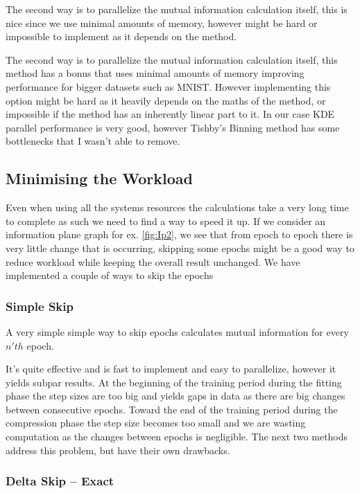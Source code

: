\documentclass[dissertation.tex]{subfiles}
\begin{document}
The second way is to parallelize the mutual information calculation itself, this
is nice since we use minimal amounts of memory, however might be hard or
impossible to implement as it depends on the method.

The second way is to parallelize the mutual information calculation itself, this
method has a  bonus that uses minimal amounts of memory improving performance
for bigger datasets such as MNIST. However implementing this option might be
hard as it heavily depends on the maths of the method, or impossible if the
method has an inherently linear part to it. In our case KDE parallel performance
is very good, however Tishby's Binning method has some bottlenecks that I
wasn't able to remove.

\subsection{Minimising the Workload}

Even when using all the systems resources the calculations take a very long
time to complete as such we need to find a way to speed it up. If we consider an
information plane graph for ex. \autoref{fig:Ip2}, we see that from epoch to
epoch there is very little change that is occurring, skipping some epochs might
be a good way to reduce workload while keeping the overall result unchanged. We
have implemented a couple of ways to skip the epochs 

\subsubsection{Simple Skip}
  
  A very simple simple way to skip epochs calculates mutual information for
  every $n'th$ epoch.

  It's quite effective and is fast to implement and easy to parallelize, however
  it yields subpar results. At the beginning of the training period during the
  fitting phase the step sizes are too big and yields gaps in data as there are
  big changes between consecutive epochs. Toward the end of the training period
  during the compression phase the step size becomes too small and we are
  wasting computation as the changes between epochs is negligible. The next two
  methods address this problem, but have their own drawbacks.

\subsubsection{Delta Skip -- Exact}
\end{document}
